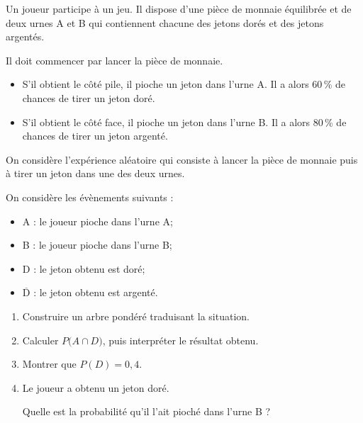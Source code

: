 Un joueur participe à un jeu. Il dispose d'une pièce de monnaie équilibrée et de deux urnes A et B qui contiennent chacune des jetons dorés et des jetons argentés.

Il doit commencer par lancer la pièce de monnaie.

\begin{itemize}[left=5mm]
	\item S'il obtient le côté pile, il pioche un jeton dans l'urne A. Il a alors 60\,\% de chances de tirer un jeton doré.
	\item S'il obtient le côté face, il pioche un jeton dans l'urne B. Il a alors 80\,\% de chances de tirer un jeton argenté.
\end{itemize}

On considère l'expérience aléatoire qui consiste à lancer la pièce de monnaie puis à tirer un jeton dans une des deux urnes.

On considère les évènements suivants :

\begin{itemize}[left=15mm]
		\item A : le joueur pioche dans l'urne A;
		\item B : le joueur pioche dans l'urne B;
		\item D : le jeton obtenu est doré;
		\item $\overline{\mathrm{D}}$ : le jeton obtenu est argenté.
\end{itemize}

\medskip

\begin{enumerate}
	\item Construire un arbre pondéré traduisant la situation.
	\item Calculer $P\big(A \cap D\big)$, puis interpréter le résultat obtenu.
	\item Montrer que $P(D)=0,4$.
	\item Le joueur a obtenu un jeton doré.

	Quelle est la probabilité qu'il l'ait pioché dans l'urne B ?
\end{enumerate}

